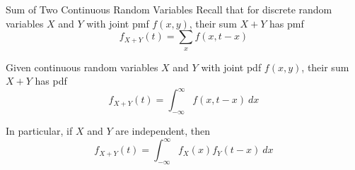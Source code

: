 \documentclass[xcolor=table]{beamer}
\renewcommand{\emph}{\textbf}
\begin{document}

\begin{frame}{Sum of Two Continuous Random Variables}
Recall that for discrete random variables $X$ and $Y$ with joint pmf $f(x,y)$, their sum $X+Y$ has pmf
$$f_{X+Y}(t) = \sum_x f(x,t-x)$$
\pause\vspace{-.3cm} \begin{block}{}
Given continuous random variables $X$ and $Y$ with joint pdf $f(x,y)$, their sum $X+Y$ has pdf
$$f_{X+Y}(t) = \int_{-\infty}^\infty f(x,t-x)\ dx$$
\end{block}
In particular, if $X$ and $Y$ are independent, then
$$f_{X+Y}(t) = \int_{-\infty}^\infty f_X(x)f_Y(t-x)\ dx$$
\end{frame}
\end{document}
